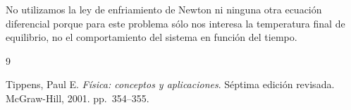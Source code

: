 \documentclass[12pt]{article}
\begin{document}
No utilizamos la ley de enfriamiento de Newton ni ninguna otra ecuación diferencial porque para 
este problema sólo nos interesa la temperatura final de equilibrio, no el comportamiento
del sistema en función del tiempo.

\begin{thebibliography}{9}

Tippens, Paul E.
\textit{Física: conceptos y aplicaciones}.
Séptima edición revisada.
McGraw-Hill, 2001.
pp.~354--355.

\end{thebibliography}
\end{document}
